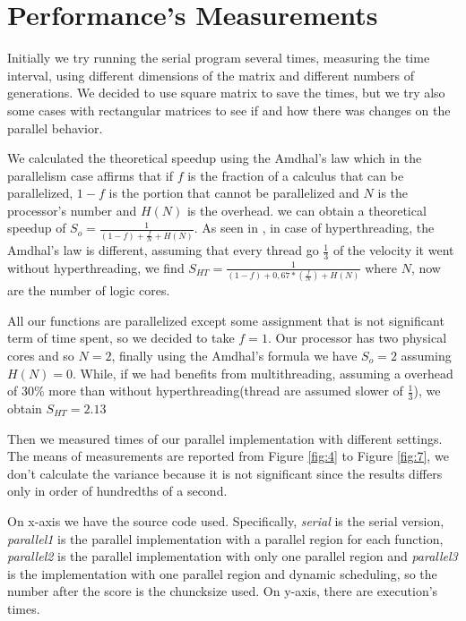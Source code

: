\documentclass[a4paper,11pt,twoside]{report}
\begin{document}
\chapter{Performance's Measurements}\label{am}
\noindent Initially we try running the serial program several times, measuring the time interval, using different dimensions of the matrix and different numbers of generations.
We decided to use square matrix to save the times, but we try also some cases with rectangular matrices to see if and how there was changes on the parallel behavior.

\noindent We calculated the theoretical speedup using the Amdhal's law which in the parallelism case affirms that if $f$ is the fraction of a calculus that can be parallelized, $1-f$ is the portion that cannot be parallelized and $N$ is the processor's number and $H(N)$ is the overhead. we can obtain a theoretical speedup of $S_{o} = \frac{1}{(1-f) + \frac{f}{N} + H(N)}$. As seen in \cite{multi}, in case of hyperthreading, the Amdhal's law is different, assuming that every thread go $\frac{1}{3}$ of the velocity it went without hyperthreading, we find $S_{HT} = \frac{1}{(1-f) + 0,67*(\frac{f}{N}) + H(N)}$ where $N$, now are the number of logic cores.

\noindent All our functions are parallelized except some assignment that is not significant term of time spent, so we decided to take $f = 1$. Our processor has two physical cores and so $N =2$, finally using the Amdhal's formula we have $S_o = 2$ assuming $H(N) =0$. While, if we had benefits from multithreading, assuming a overhead of 30\% more than without hyperthreading(thread are assumed slower of $\frac{1}{3}$), we obtain $S_{HT} = 2.13$

\noindent Then we measured times of our parallel implementation with different settings. The means of measurements are reported from Figure \ref{fig:4} to Figure \ref{fig:7}, we don't calculate the variance because it is not significant since the results differs only in order of hundredths of a second.

\noindent On x-axis we have the source code used. Specifically, \emph{serial} is the serial version, \emph{parallel1} is the parallel implementation with a parallel region for each function, \emph{parallel2} is the parallel implementation with only one parallel region and \emph{parallel3} is the implementation with one parallel region and dynamic scheduling, so the number after the score is the chuncksize used. On y-axis, there are execution's times.
\end{document}

